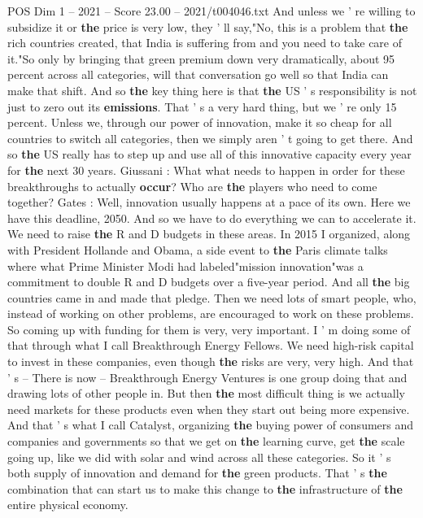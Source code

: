 \begin{textsample}{POS Dim 1 – 2021 – Score 23.00 – 2021/t004046.txt}
And unless we ' re willing to subsidize it or \textbf{the} price is very low, they ' ll say,"No, this is a problem that \textbf{the} rich countries created, that India is suffering from and you need to take care of it."So only by bringing that green premium down very dramatically, about 95 percent across all categories, will that conversation go well so that India can make that shift.
And so \textbf{the} key thing here is that \textbf{the} US ' s responsibility is not just to zero out its \textbf{emissions}.
That ' s a very hard thing, but we ' re only 15 percent.
Unless we, through our power of innovation, make it so cheap for all countries to switch all categories, then we simply aren ' t going to get there.
And so \textbf{the} US really has to step up and use all of this innovative capacity every year for \textbf{the} next 30 years.
Giussani : What what needs to happen in order for these breakthroughs to actually \textbf{occur}?
Who are \textbf{the} players who need to come together?
Gates : Well, innovation usually happens at a pace of its own.
Here we have this deadline, 2050.
And so we have to do everything we can to accelerate it.
We need to raise \textbf{the} R and D budgets in these areas.
In 2015 I organized, along with President Hollande and Obama, a side event to \textbf{the} Paris climate talks where what Prime Minister Modi had labeled"mission innovation"was a commitment to double R and D budgets over a five-year period.
And all \textbf{the} big countries came in and made that pledge.
Then we need lots of smart people, who, instead of working on other problems, are encouraged to work on these problems.
So coming up with funding for them is very, very important.
I ' m doing some of that through what I call Breakthrough Energy Fellows.
We need high-risk capital to invest in these companies, even though \textbf{the} risks are very, very high.
And that ' s -- There is now -- Breakthrough Energy Ventures is one group doing that and drawing lots of other people in.
But then \textbf{the} most difficult thing is we actually need markets for these products even when they start out being more expensive.
And that ' s what I call Catalyst, organizing \textbf{the} buying power of consumers and companies and governments so that we get on \textbf{the} learning curve, get \textbf{the} scale going up, like we did with solar and wind across all these categories.
So it ' s both supply of innovation and demand for \textbf{the} green products.
That ' s \textbf{the} combination that can start us to make this change to \textbf{the} infrastructure of \textbf{the} entire physical economy.

\end{textsample}
